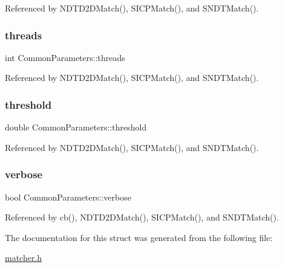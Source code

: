 Referenced by N\+D\+T\+D2\+D\+Match(), S\+I\+C\+P\+Match(), and S\+N\+D\+T\+Match().

\mbox{\label{structCommonParameters_abed5578621c9e84ea56f079bb1c31d10}} 
\subsubsection{\texorpdfstring{threads}{threads}}
{\footnotesize\ttfamily int Common\+Parameters\+::threads}



Referenced by N\+D\+T\+D2\+D\+Match(), S\+I\+C\+P\+Match(), and S\+N\+D\+T\+Match().

\mbox{\label{structCommonParameters_ace212b0c9895dd12986c74c76c59656d}} 
\subsubsection{\texorpdfstring{threshold}{threshold}}
{\footnotesize\ttfamily double Common\+Parameters\+::threshold}



Referenced by N\+D\+T\+D2\+D\+Match(), S\+I\+C\+P\+Match(), and S\+N\+D\+T\+Match().

\mbox{\label{structCommonParameters_af92a01f74aa91c3cbd199fc4d6681d9b}} 
\subsubsection{\texorpdfstring{verbose}{verbose}}
{\footnotesize\ttfamily bool Common\+Parameters\+::verbose}



Referenced by cb(), N\+D\+T\+D2\+D\+Match(), S\+I\+C\+P\+Match(), and S\+N\+D\+T\+Match().



The documentation for this struct was generated from the following file\+:\begin{DoxyCompactItemize}
\item 
\hyperlink{matcher_8h}{matcher.\+h}\end{DoxyCompactItemize}
